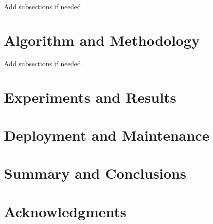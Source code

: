 \documentclass[fleqn,10pt]{SelfArx} %
\begin{document}
Add subsections if needed.
\bigskip
\bigskip


\section{Algorithm and Methodology}

Add subsections if needed.

\bigskip
\bigskip
\section{Experiments and Results}


\bigskip
\bigskip

\section{Deployment and Maintenance}


\bigskip
\bigskip

\section{Summary and Conclusions}
\bigskip
\bigskip
\bigskip


\section*{Acknowledgments} %







\end{document}
